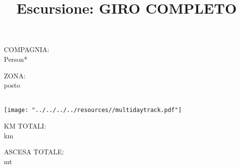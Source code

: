 \documentclass{article}
\title{\Huge Escursione: }
\author{}
\date{}
\begin{document}


\maketitle

\begin{minipage}[t]{0.22\textwidth}
    \faSmile[regular] \quad COMPAGNIA: \\
    \quad Person*

    \vspace*{1cm}

    \faMapMarked \quad  ZONA: \\
    \quad posto

\end{minipage} 
\begin{minipage}{0.5\textwidth}
    \centering
    \title{\faRoute \quad GIRO COMPLETO} \\
    \texttt{[image: "../../../../resources//multidaytrack.pdf"]}
\end{minipage}
\begin{minipage}[t]{0.22\textwidth}
    \faRoad \quad KM TOTALI: \\
     km

    \vspace*{1cm}

    \faRulerVertical \quad ASCESA TOTALE: \\
     mt 

    \end{minipage}

\begin{center}
\end{center}

\end{document}
